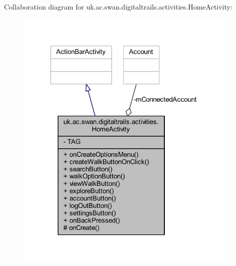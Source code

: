Collaboration diagram for uk.\+ac.\+swan.\+digitaltrails.\+activities.\+Home\+Activity\+:
\nopagebreak
\begin{figure}[H]
\begin{center}
\leavevmode
\includegraphics[width=299pt]{classuk_1_1ac_1_1swan_1_1digitaltrails_1_1activities_1_1_home_activity__coll__graph}
\end{center}
\end{figure}
